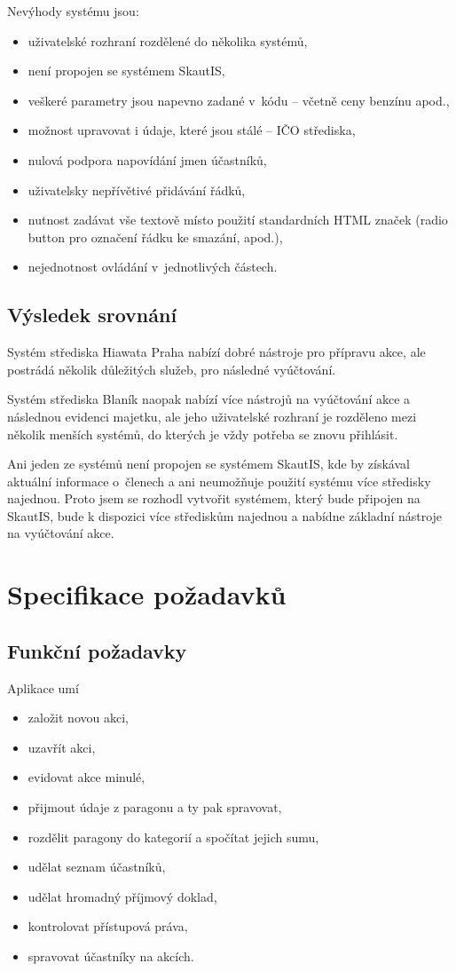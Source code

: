 \documentclass[thesis=B,czech]{FITthesis}[2011/06/14]
\begin{document}
Nevýhody systému jsou:
\begin{itemize}
	\item uživatelské rozhraní rozdělené do několika systémů,
	\item není propojen se systémem SkautIS,
	\item veškeré parametry jsou napevno zadané v~kódu -- včetně ceny benzínu apod.,
	\item možnost upravovat i údaje, které jsou stálé -- IČO střediska,
	\item nulová podpora napovídání jmen účastníků,
	\item uživatelsky nepřívětivé přidávání řádků,
	\item nutnost zadávat vše textově místo použití standardních HTML značek (radio button pro označení řádku ke smazání, apod.),
	\item nejednotnost ovládání v~jednotlivých částech.
\end{itemize}

\subsection{Výsledek srovnání}
Systém střediska Hiawata Praha nabízí dobré nástroje pro přípravu akce, ale postrádá několik důležitých služeb, pro následné vyúčtování.

Systém střediska Blaník naopak nabízí více nástrojů na vyúčtování akce a následnou evidenci majetku, ale jeho uživatelské rozhraní je rozděleno mezi několik menších systémů, do kterých je vždy potřeba se znovu přihlásit.

Ani jeden ze systémů není propojen se systémem SkautIS, kde by získával aktuální informace o~členech a ani neumožňuje použití systému více středisky najednou. Proto jsem se rozhodl vytvořit systémem, který bude připojen na SkautIS, bude k dispozici více střediskům najednou a nabídne základní nástroje na vyúčtování akce.

\section{Specifikace požadavků}
\subsection{Funkční požadavky}
Aplikace umí
\begin{itemize}
	\item založit novou akci,
	\item uzavřít akci,
	\item evidovat akce minulé,
	\item přijmout údaje z paragonu a ty pak spravovat,
	\item rozdělit paragony do kategorií a spočítat jejich sumu,
	\item udělat seznam účastníků,
	\item udělat hromadný příjmový doklad,
	\item kontrolovat přístupová práva,
	\item spravovat účastníky na akcích.
\end{itemize}
\end{document}
